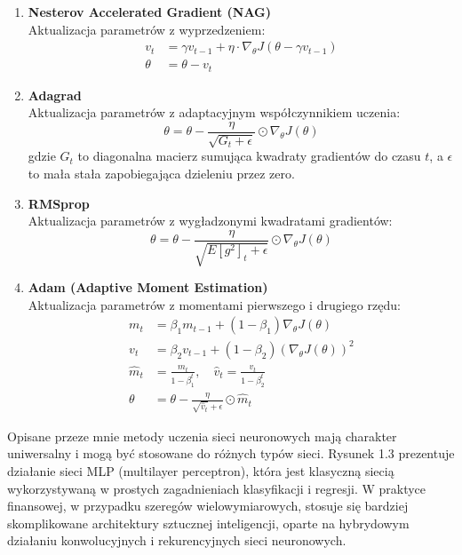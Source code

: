 \begin{enumerate}
\begin{enumerate}[label=\arabic*.]
    \item \textbf{Nesterov Accelerated Gradient (NAG)}\\
    Aktualizacja parametrów z wyprzedzeniem:
    \begin{align*}
    v_t &= \gamma v_{t-1} + \eta \cdot \nabla_\theta J(\theta - \gamma v_{t-1}) \\
    \theta &= \theta - v_t
    \end{align*}
    
    \item \textbf{Adagrad}\\
    Aktualizacja parametrów z adaptacyjnym współczynnikiem uczenia:
    \[ \theta = \theta - \frac{\eta}{\sqrt{G_t + \epsilon}} \odot \nabla_\theta J(\theta) \]
    gdzie \(G_t\) to diagonalna macierz sumująca kwadraty gradientów do czasu \(t\), a \(\epsilon\) to mała stała zapobiegająca dzieleniu przez zero.
    
    \item \textbf{RMSprop}\\
    Aktualizacja parametrów z wygładzonymi kwadratami gradientów:
    \[ \theta = \theta - \frac{\eta}{\sqrt{E[g^2]_t + \epsilon}} \odot \nabla_\theta J(\theta) \]
    
    \item \textbf{Adam (Adaptive Moment Estimation)}\\
    Aktualizacja parametrów z momentami pierwszego i drugiego rzędu:
    \begin{align*}
    m_t &= \beta_1 m_{t-1} + (1 - \beta_1) \nabla_\theta J(\theta) \\
    v_t &= \beta_2 v_{t-1} + (1 - \beta_2) (\nabla_\theta J(\theta))^2 \\
    \hat{m}_t &= \frac{m_t}{1 - \beta_1^t}, \quad \hat{v}_t = \frac{v_t}{1 - \beta_2^t} \\
    \theta &= \theta - \frac{\eta}{\sqrt{\hat{v}_t} + \epsilon} \odot \hat{m}_t
    \end{align*}
\end{enumerate}
\label{subsec:podrozdzial-2-rzedu}
Opisane przeze mnie metody uczenia sieci neuronowych mają charakter uniwersalny i mogą być stosowane do różnych typów sieci. Rysunek 1.3 prezentuje działanie sieci MLP (multilayer perceptron), która jest klasyczną siecią wykorzystywaną w prostych zagadnieniach klasyfikacji i regresji. W praktyce finansowej, w przypadku szeregów wielowymiarowych, stosuje się bardziej skomplikowane architektury sztucznej inteligencji, oparte na hybrydowym działaniu konwolucyjnych i rekurencyjnych sieci neuronowych. 


\end{enumerate}
